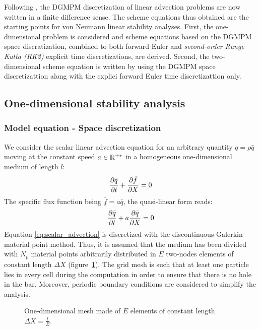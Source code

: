 Following \cite{Hirsch}, the DGMPM discretization of linear advection problems are now written in a finite difference sense. The scheme equations thus obtained are the starting points for von Neumann linear stability analyses. First, the one-dimensional problem is considered and scheme equations based on the DGMPM space discratization, combined to both forward Euler and \textit{second-order Runge Kutta (RK2)} explicit time discretizations, are derived. Second, the two-dimensional scheme equation is written by using the DGMPM space discretizattion along with the explici forward Euler time discretizattion only.

\subsection{One-dimensional stability analysis}
\subsubsection*{Model equation - Space discretization}
We consider the scalar linear advection equation for an arbitrary quantity $q=\rho \bar{q}$ moving at the constant speed $a \in \mathbb{R}^{+*}$ in a homogeneous one-dimensional medium of length $l$:
\begin{equation}
\frac{\partial \bar{q}}{\partial t} + \frac{\partial \bar{f}}{\partial X} = 0 
\end{equation}
The specific flux function being $\bar{f} = a\bar{q}$, the quasi-linear form reads:
\begin{equation}
\frac{\partial \bar{q}}{\partial t} + a\frac{\partial \bar{q}}{\partial X} = 0 \label{eq:scalar_advection}
\end{equation}
Equation \eqref{eq:scalar_advection} is discretized with the discontinuous Galerkin material point method. Thus, it is assumed that the medium has been divided with $N_p$ material points arbitrarily distributed in $E$ two-nodes elements of constant length $\Delta X$ (figure~\ref{fig:1Dmesh}). The grid mesh is such that at least one particle lies in every cell during the computation in order to ensure that there is no hole in the bar. Moreover, periodic boundary conditions are considered to simplify the analysis.
\begin{figure}[h!]
  \centering

  \caption{One-dimensional mesh made of $E$ elements of constant length $\Delta X = \frac{l}{E}$.}\label{fig:1Dmesh}
\end{figure}

